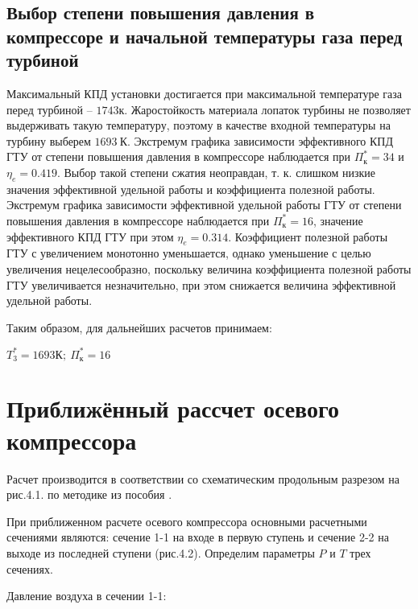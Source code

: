 
\newpage
\subsection{Выбор степени повышения давления в компрессоре и начальной температуры газа перед турбиной}

	Максимальный КПД установки достигается при максимальной температуре газа перед турбиной – $1743 \text{к}$. Жаростойкость материала лопаток турбины не позволяет выдерживать такую температуру, поэтому в качестве входной температуры на турбину выберем $1693 \ \text{К}$. Экстремум графика зависимости эффективного КПД ГТУ от степени повышения давления в компрессоре наблюдается при $\Pi_{\text{к}}^*=34$ и $\eta_e = 0.419$. Выбор такой степени сжатия неоправдан, т. к. слишком низкие значения эффективной удельной работы и коэффициента полезной работы. Экстремум графика зависимости эффективной удельной работы ГТУ от степени повышения давления в компрессоре наблюдается при $\Pi_{\text{к}}^*=16$, значение эффективного КПД ГТУ при этом $\eta_e = 0.314$. Коэффициент полезной работы ГТУ с увеличением  монотонно уменьшается, однако уменьшение  с целью увеличения  нецелесообразно, поскольку величина коэффициента полезной работы ГТУ увеличивается незначительно, при этом снижается величина эффективной удельной работы.

 Таким образом, для дальнейших расчетов принимаем:
 
$T_3^* = 1693 \text{К}; \ \Pi_{\text{к}}^*=16$

\newpage
\section{Приближённый рассчет осевого компрессора}

Расчет производится в соответствии со схематическим продольным разрезом на рис.4.1. по методике из пособия \cite{COMP}.


При приближенном расчете осевого компрессора основными расчетными сечениями являются: сечение 1-1 на входе в первую ступень и сечение 2-2  на выходе из последней ступени (рис.4.2). Определим параметры $P$ и $T$ трех сечениях.

Давление воздуха в сечении 1-1:

